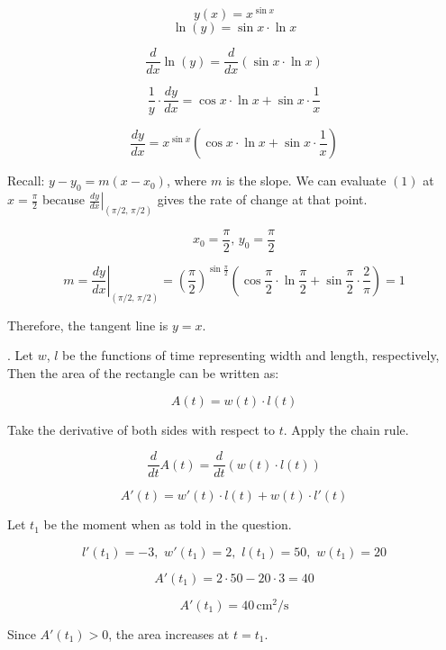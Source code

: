 \documentclass{article}
\begin{document}
\[y(x) = x^{\sin x}\]
\[\ln(y) = \sin x \cdot \ln x\]

\[\frac{d}{dx}\ln(y) = \frac{d}{dx}(\sin x \cdot \ln x)\]

\[\frac{1}{y} \cdot \frac{dy}{dx} =  \cos x \cdot \ln x +  \sin x \cdot \frac{1}{x}\]

\begin{equation} \frac{dy}{dx} = x^{\sin x}\left(\cos x \cdot \ln x +  \sin x \cdot \frac{1}{x}\right)\end{equation}

\hfill

\noindent Recall: $y-y_0 = m(x-x_0)$, where $m$ is the slope. We can evaluate $(1)$ at $x = \frac{\pi}{2}$ because $\left.\frac{dy}{dx}\right|_{(\pi/2,\, \pi/2)}$ gives the rate of change at that point.

\[x_0=\frac{\pi}{2},\,y_0 = \frac{\pi}{2}\]

\[m=\left.\frac{dy}{dx}\right|_{(\pi/2,\, \pi/2)} = \left(\frac{\pi}{2}\right)^{\sin \frac{\pi}{2}}\left(\cos\frac{\pi}{2} \cdot \ln \frac{\pi}{2} + \sin \frac{\pi}{2} \cdot \frac{2}{\pi}\right) = 1\]

\hfill

\noindent Therefore, the tangent line is $\boxed{y=x}$.

\hfill

. Let $w$, $l$ be the functions of time representing width and length, respectively, Then the area of the rectangle can be written as:

\[A(t) = w(t)\cdot l(t)\]

\hfill

\noindent Take the derivative of both sides with respect to $t$. Apply the chain rule.

\[\frac{d}{dt}A(t) = \frac{d}{dt}(w(t)\cdot l(t))\]

\[A'(t) = w'(t)\cdot l(t) + w(t)\cdot l'(t)\]

\hfill

\noindent Let $t_1$ be the moment when as told in the question.

\[l'(t_1) = -3,\,\,w'(t_1) = 2,\,\,l(t_1) = 50,\,\, w(t_1) = 20\]

\[A'(t_1) = 2\cdot 50 - 20\cdot 3 = 40\]

\[\boxed{A'(t_1) = 40\, \text{cm}^2/\text{s}}\]

\hfill

\noindent Since $A'(t_1) > 0$, the area increases at $t=t_1$.

\hfill
\end{document}
